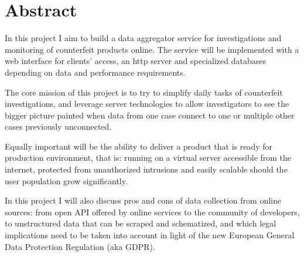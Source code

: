 \chapter{Abstract}
In this project I aim to build a data aggregator service for investigations and
monitoring of counterfeit products online. The service will be implemented with
a web interface for clients' access, an http server and specialized databases
depending on data and performance requirements.

The core mission of this project is to try to simplify daily tasks of counterfeit
investigations, and leverage server technologies to allow investigators to see
the bigger picture painted when data from one case connect to one or multiple
other cases previously unconnected.

Equally important will be the ability to deliver a product that is ready for
production environment, that is: running on a virtual server accessible from the
internet, protected from unauthorized intrusions and easily scalable should the
user population grow significantly.

In this project I will also discuss pros and cons of data collection from online
sources: from open API offered by online services to the community of
developers, to unstructured data that can be scraped and schematized, and which
legal implications need to be taken into account in light of the new European
General Data Protection Regulation (aka GDPR).
